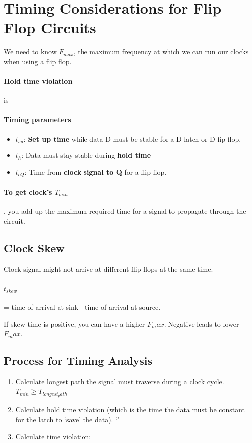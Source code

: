 \documentclass[a4paper,12pt]{report}
\begin{document}
\section{Timing Considerations for Flip Flop Circuits}
We need to know $F_{max}$, the maximum frequency at which we can run our clocks when using a flip flop.

\paragraph{Hold time violation } is 
\paragraph{Timing parameters } 
\begin{itemize}
\item $t_{su}$: \textbf{Set up time} while data D must be stable for a D-latch or D-fip flop. 
\item $t_h$: Data must stay stable during \textbf{hold time}
\item $t_{cQ}$: Time from \textbf{clock signal to Q} for a flip flop.
\end{itemize}

\paragraph{To get clock's $T_{min}$}, you add up the maximum required time for a signal to propagate through the circuit. 

\subsection{Clock Skew}
Clock signal might not arrive at different flip flops at the same time. 

\paragraph{$t_{skew}$} = time of arrival at sink - time of arrival at source.

If skew time is positive, you can have a higher $F_max$. Negative leads to lower $F_max$. 

\subsection{Process for Timing Analysis}
\begin{enumerate}
\item Calculate longest path the signal must traverse during a clock cycle. $T_{min} \geq T_{longest_path}$
\item Calculate hold time violation (which is the time the data must be constant for the latch to `save' the data). `'
\item Calculate time violation: 
\end{enumerate}
\end{document}
